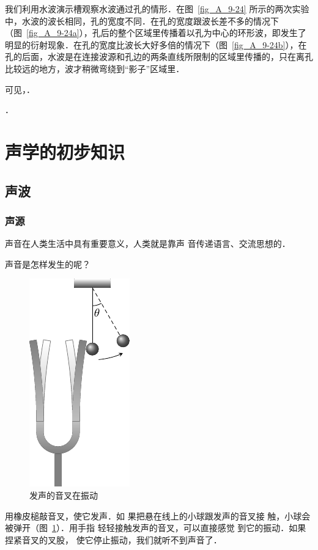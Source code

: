 我们利用水波演示槽观察水波通过孔的情形．在图~\ref{fig_A_9-24} 所示的两次实验中，水波的波长相同，孔的宽度不同．在孔的宽度跟波长差不多的情况下（图~\ref{fig_A_9-24a}），孔后的整个区域里传播着以孔为中心的环形波，即发生了明显的衍射现象．在孔的宽度比波长大好多倍的情况下（图~\ref{fig_A_9-24b}），在孔的后面，水波是在连接波源和孔边的两条直线所限制的区域里传播的，只在离孔比较远的地方，波才稍微弯绕到“影子”区域里．


可见，．

．

\section{声学的初步知识}
\subsection{声波}
\subsubsection{声源} 

声音在人类生活中具有重要意义，人类就是靠声
音传递语言、交流思想的．

声音是怎样发生的呢？
\begin{figure}[htbp]
    \centering
    \includegraphics{fig/A/9-25.pdf}
    \caption{发声的音叉在振动}\label{fig_A_9-25}
\end{figure}

用橡皮槌敲音叉，使它发声．如
果把悬在线上的小球跟发声的音叉接
触，小球会被弹开（图~\ref{fig_A_9-25}）．用手指
轻轻接触发声的音叉，可以直接感觉
到它的振动．如果捏紧音叉的叉股，
使它停止振动，我们就听不到声音了．

